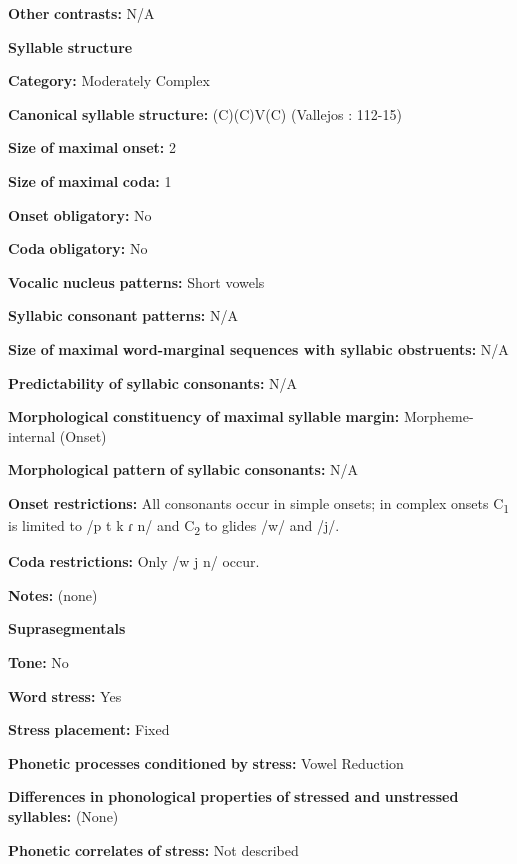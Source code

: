 \begin{styleBody}
\textbf{Other} \textbf{contrasts:} N/A

\textbf{Syllable} \textbf{structure}

\textbf{Category:} Moderately Complex

\textbf{Canonical} \textbf{syllable} \textbf{structure:} (C)(C)V(C) (Vallejos \citealt{Yopán2010}: 112-15)

\textbf{Size} \textbf{of} \textbf{maximal} \textbf{onset:} 2

\textbf{Size} \textbf{of} \textbf{maximal} \textbf{coda:} 1

\textbf{Onset} \textbf{obligatory:} No

\textbf{Coda} \textbf{obligatory:} No

\textbf{Vocalic} \textbf{nucleus} \textbf{patterns:} Short vowels

\textbf{Syllabic} \textbf{consonant} \textbf{patterns:} N/A

\textbf{Size} \textbf{of} \textbf{maximal} \textbf{word{}-marginal sequences with syllabic obstruents:} N/A

\textbf{Predictability} \textbf{of} \textbf{syllabic} \textbf{consonants:} N/A

\textbf{Morphological} \textbf{constituency} \textbf{of} \textbf{maximal} \textbf{syllable} \textbf{margin:} Morpheme-internal (Onset)

\textbf{Morphological} \textbf{pattern} \textbf{of} \textbf{syllabic} \textbf{consonants:} N/A

\textbf{Onset} \textbf{restrictions:} All consonants occur in simple onsets; in complex onsets C\textsubscript{1} is limited to /p t k ɾ n/ and C\textsubscript{2} to glides /w/ and /j/.

\textbf{Coda} \textbf{restrictions:} Only /w j n/ occur.

\textbf{Notes:} (none)

\textbf{Suprasegmentals}

\textbf{Tone:} No

\textbf{Word} \textbf{stress:} Yes

\textbf{Stress} \textbf{placement:} Fixed

\textbf{Phonetic} \textbf{processes} \textbf{conditioned} \textbf{by} \textbf{stress:} Vowel Reduction

\textbf{Differences} \textbf{in} \textbf{phonological} \textbf{properties} \textbf{of} \textbf{stressed} \textbf{and} \textbf{unstressed} \textbf{syllables:} (None)

\textbf{Phonetic} \textbf{correlates} \textbf{of} \textbf{stress:} Not described


\end{styleBody}

